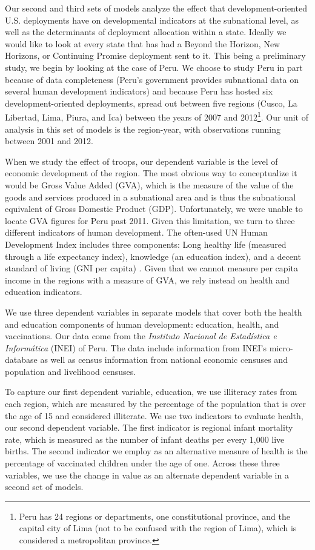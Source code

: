\documentclass[12pt]{article}
\begin{document}
\begin{doublespace}
Our second and third sets of models analyze the effect that development-oriented U.S. deployments have on developmental indicators at the subnational level, as well as the determinants of deployment allocation within a state.  Ideally we would like to look at every state that has had a Beyond the Horizon, New Horizons, or Continuing Promise deployment sent to it.  This being a preliminary study, we begin by looking at the case of Peru.  We choose to study Peru in part because of data completeness (Peru's government provides subnational data on several human development indicators) and because Peru has hosted six development-oriented deployments, spread out between five regions (Cusco, La Libertad, Lima, Piura, and Ica) between the years of 2007 and 2012\footnote{Peru has 24 regions or departments, one constitutional province, and the capital city of Lima (not to be confused with the region of Lima), which is considered a metropolitan province.}. Our unit of analysis in this set of models is the region-year, with observations running between 2001 and 2012.  

When we study the effect of troops, our dependent variable is the level of economic development of the region.  The most obvious way to conceptualize it would be Gross Value Added (GVA), which is the measure of the value of the goods and services produced in a subnational area and is thus the subnational equivalent of Gross Domestic Product (GDP).  Unfortunately, we were unable to locate GVA figures for Peru past 2011.  Given this limitation, we turn to three different indicators of human development.  The often-used UN Human Development Index includes three components: Long healthy life (measured through a life expectancy index), knowledge (an education index), and a decent standard of living (GNI per capita) \cite{}.  Given that we cannot measure per capita income in the regions with a measure of GVA, we rely instead on health and education indicators.

We use three dependent variables in separate models that cover both the health and education components of human development: education, health, and vaccinations. Our data come from the \textit{Instituto Nacional de Estadística e Informática} (INEI) of Peru. The data include information from INEI's micro-database as well as census information from national economic censuses and population and livelihood censuses. 

To capture our first dependent variable, education, we use illiteracy rates from each region, which are measured by the percentage of the population that is over the age of 15 and considered illiterate. We use two indicators to evaluate health, our second dependent variable. The first indicator is regional infant mortality rate, which is measured as the number of infant deaths per every 1,000 live births. The second indicator we employ as an alternative measure of health is the percentage of vaccinated children under the age of one. Across these three variables, we use the change in value as an alternate dependent variable in a second set of models. 


\end{doublespace}
\end{document}
